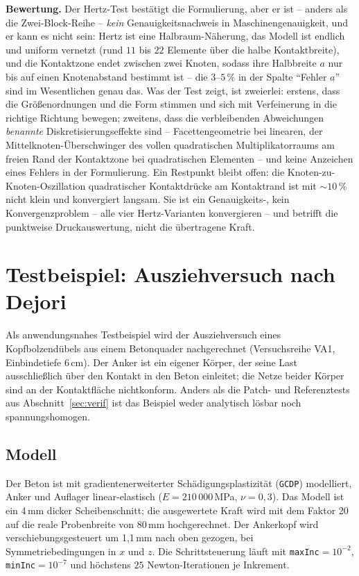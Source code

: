 \documentclass[a4paper,11pt]{article}
\newcommand{\code}[1]{\texttt{\small #1}}
\let\stdsection\section
\renewcommand{\section}{\clearpage\stdsection}
\begin{document}
\medskip
\noindent \textbf{Bewertung.} Der Hertz-Test bestätigt die Formulierung, aber er ist -- anders als
die Zwei-Block-Reihe -- \emph{kein} Genauigkeitsnachweis in Maschinengenauigkeit, und er kann es
nicht sein: Hertz ist eine Halbraum-Näherung, das Modell ist endlich und uniform vernetzt (rund
$11$ bis $22$ Elemente über die halbe Kontaktbreite), und die Kontaktzone endet zwischen zwei
Knoten, sodass ihre Halbbreite $a$ nur bis auf einen Knotenabstand bestimmt ist -- die
$3$--$5\,\%$ in der Spalte ``Fehler $a$'' sind im Wesentlichen genau das. Was der Test zeigt, ist
zweierlei: erstens, dass die Größenordnungen und die Form stimmen und sich mit Verfeinerung in die
richtige Richtung bewegen; zweitens, dass die verbleibenden Abweichungen \emph{benannte}
Diskretisierungseffekte sind -- Facettengeometrie bei linearen, der Mittelknoten-Überschwinger
des vollen quadratischen Multiplikatorraums am freien Rand der Kontaktzone bei quadratischen
Elementen -- und keine Anzeichen eines Fehlers in der Formulierung. Ein Restpunkt
bleibt offen: die Knoten-zu-Knoten-Oszillation quadratischer Kontaktdrücke am Kontaktrand ist mit
$\sim\!10\,\%$ nicht klein und konvergiert langsam. Sie ist ein Genauigkeits-, kein
Konvergenzproblem -- alle vier Hertz-Varianten konvergieren -- und betrifft die punktweise
Druckauswertung, nicht die übertragene Kraft.

\section{Testbeispiel: Ausziehversuch nach Dejori}
\label{sec:testbeispiel}

Als anwendungsnahes Testbeispiel wird der Ausziehversuch eines Kopfbolzendübels aus einem
Betonquader nachgerechnet (Versuchsreihe VA1, Einbindetiefe 6\,cm). Der Anker ist ein eigener
Körper, der seine Last ausschließlich über den Kontakt in den Beton einleitet; die Netze beider
Körper sind an der Kontaktfläche nichtkonform. Anders als die Patch- und Referenztests aus
Abschnitt~\ref{sec:verif} ist das Beispiel weder analytisch lösbar noch spannungshomogen.

\subsection{Modell}
Der Beton ist mit gradientenerweiterter Schädigungsplastizität (\code{GCDP}) modelliert, Anker und
Auflager linear-elastisch ($E=210\,000$\,MPa, $\nu=0{,}3$). Das Modell ist ein 4\,mm dicker
Scheibenschnitt; die ausgewertete Kraft wird mit dem Faktor 20 auf die reale Probenbreite von
80\,mm hochgerechnet. Der Ankerkopf wird verschiebungsgesteuert um 1{,}1\,mm nach oben gezogen, bei
Symmetriebedingungen in $x$ und $z$. Die Schrittsteuerung läuft mit
\code{maxInc}${}=10^{-2}$, \code{minInc}${}=10^{-7}$ und höchstens $25$ Newton-Iterationen je
Inkrement.
\end{document}
